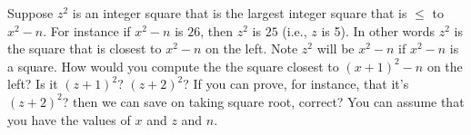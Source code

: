   Suppose $z^2$ is an integer square that is the largest integer square that is $\leq$ to $x^2 - n$.
  For instance if $x^2 - n$ is $26$, then $z^2$ is $25$ (i.e., $z$ is 5).
  In other words $z^2$ is the square that is closest to $x^2 - n$ on the left.
  Note $z^2$ will be $x^2 - n$ if $x^2 - n$ is a square.
  How would you compute the the square closest to $(x + 1)^2 - n$ on the left?
  Is it $(z + 1)^2$? $(z + 2)^2$?
  If you can prove, for instance, that it's $(z + 2)^2$? then we can save
  on taking square root, correct?
  You can assume that you have the values of $x$ and $z$ and $n$.
